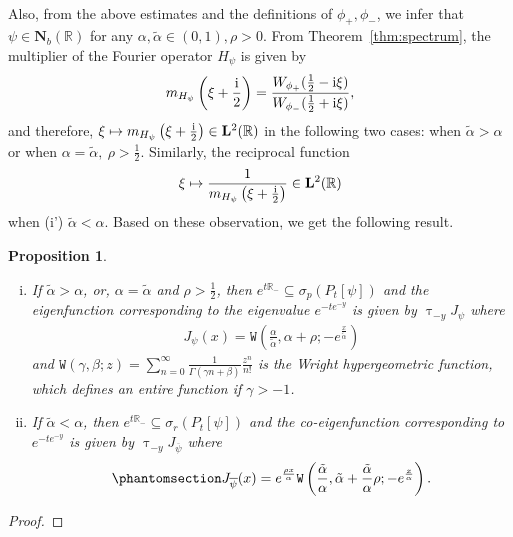\documentclass[12pt]{amsart}
\newcommand{\hlabel}{\phantomsection\label}
\numberwithin{equation}{section}
\newcommand{\bb}{\mathbb}
\newcommand{\ov}{\overline}
\newcommand{\ttt}{\mathtt}
\newcommand{\bmrm}[2][2]{\mathbf{#2}^{#1}}
\newcommand{\Jpo}{J_{\psi}}
\newcommand{\Hpsi}{H_\psi}
\renewcommand{\tau}{\uptau}
\newtheorem{prop}[thm]{Proposition}
\theoremstyle{definition}
\theoremstyle{assump}
\theoremstyle{remark}
\begin{document}
{\begin{equation*}
\begin{aligned}
\end{aligned}
\end{equation*}
Also, from the above estimates and the definitions of $\phi_+, \phi_-$, we infer that $\psi\in\mathbf{N}_b(\bb{R})$ for any $\alpha,\tilde{\alpha}\in (0,1), \rho>0$. From Theorem~\ref{thm:spectrum}, the multiplier of the Fourier  operator $\Hpsi$ is given by
\begin{align*}
m_{\Hpsi}\left(\xi+\frac{{\rm{i}}}{2}   \right)=\frac{W_{\phi_+}(\frac{1}{2}-{\rm{i}}\xi   )}{W_{\phi_-}(\frac{1}{2}+{\rm{i}}\xi)},
\end{align*}
and therefore, $\xi\mapsto m_{\Hpsi}\left(\xi+\frac{{\rm{i}}}{2}   \right)\in\bmrm{L}(\bb{R})$ in the following two cases:  when $\tilde{\alpha}>\alpha$ or  when $\alpha=\tilde{\alpha}, \ \rho>\frac{1}{2}$. Similarly,  the reciprocal function
\begin{align*}
\xi\mapsto \frac{1}{m_{\Hpsi}\left(\xi+\frac{{\rm{i}}}{2} \right)} \in\bmrm{L}(\bb{R})
\end{align*}
 when (i') $\tilde{\alpha}<\alpha$. Based on these  observation, we get the following result.
\begin{prop}
\begin{enumerate}[(i)]
\item If $\tilde{\alpha}>\alpha$, or, $\alpha=\tilde{\alpha}$ and  $\rho>\frac{1}{2}$, then $e^{t\bb{R}_-}\subseteq\sigma_p(P_t[\psi])$ and the eigenfunction corresponding to the eigenvalue $e^{-te^{-y}}$ is given by $\tau_{-y}\Jpo$ where
\begin{align*}
\Jpo(x)=\ttt{W}\left(\frac{\alpha}{\tilde{\alpha}},\alpha+\rho; -e^{\frac{x}{\tilde{\alpha}}}\right)
\end{align*}
and $\ttt{W}(\gamma,\beta;z)=\sum_{n=0}^\infty\frac{1}{\Gamma(\gamma n+\beta)}\frac{z^n}{n!}$ is the Wright hypergeometric function, which defines an entire function if $\gamma>-1$.
\item If  $\tilde{\alpha}<\alpha$, then $e^{t\bb{R}_-}\subseteq\sigma_r(P_t[\psi])$ and the co-eigenfunction corresponding to $e^{-te^{-y}}$ is given by $\tau_{-y}J_{\ov{\psi}}$ where
\begin{align}\hlabel{eq:co-eigenfunction_1}
J_{\ov{\psi}}(x)=e^{\frac{\rho x}{\alpha}}\ttt{W}\left(\frac{\tilde{\alpha}}{\alpha},\tilde{\alpha}+\frac{\tilde{\alpha}}{\alpha}\rho; -e^{\frac{x}{\alpha}}\right).
\end{align}
\end{enumerate}
\end{prop}
\begin{proof}

\end{proof}}
\end{document}
